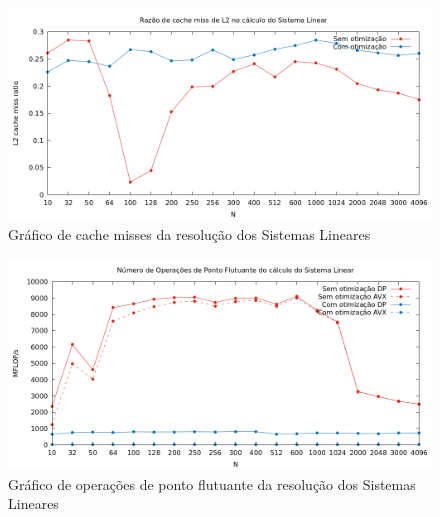 \documentclass{article}
\begin{document}
\begin{figure}[htp]
    \centering
    \includegraphics[width=12cm]{l2cache_sistema_linear.png}
    \caption{Gráfico de cache misses da resolução dos Sistemas Lineares}
    \label{fig:l2_sl}
\end{figure}

\begin{figure}[htp]
    \centering
    \includegraphics[width=12cm]{flops_dp_sistema_linear.png}
    \caption{Gráfico de operações de ponto flutuante da resolução dos Sistemas Lineares}
    \label{fig:flops_sl}
\end{figure}
\end{document}
